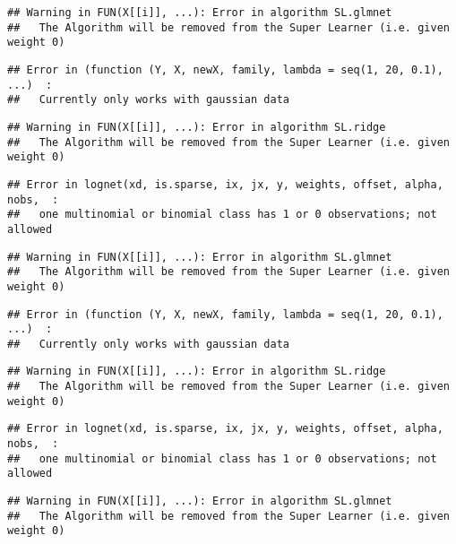 \documentclass[
]{article}
\begin{document}
\begin{verbatim}
## Warning in FUN(X[[i]], ...): Error in algorithm SL.glmnet 
##   The Algorithm will be removed from the Super Learner (i.e. given weight 0)
\end{verbatim}

\begin{verbatim}
## Error in (function (Y, X, newX, family, lambda = seq(1, 20, 0.1), ...)  : 
##   Currently only works with gaussian data
\end{verbatim}

\begin{verbatim}
## Warning in FUN(X[[i]], ...): Error in algorithm SL.ridge 
##   The Algorithm will be removed from the Super Learner (i.e. given weight 0)
\end{verbatim}

\begin{verbatim}
## Error in lognet(xd, is.sparse, ix, jx, y, weights, offset, alpha, nobs,  : 
##   one multinomial or binomial class has 1 or 0 observations; not allowed
\end{verbatim}

\begin{verbatim}
## Warning in FUN(X[[i]], ...): Error in algorithm SL.glmnet 
##   The Algorithm will be removed from the Super Learner (i.e. given weight 0)
\end{verbatim}

\begin{verbatim}
## Error in (function (Y, X, newX, family, lambda = seq(1, 20, 0.1), ...)  : 
##   Currently only works with gaussian data
\end{verbatim}

\begin{verbatim}
## Warning in FUN(X[[i]], ...): Error in algorithm SL.ridge 
##   The Algorithm will be removed from the Super Learner (i.e. given weight 0)
\end{verbatim}

\begin{verbatim}
## Error in lognet(xd, is.sparse, ix, jx, y, weights, offset, alpha, nobs,  : 
##   one multinomial or binomial class has 1 or 0 observations; not allowed
\end{verbatim}

\begin{verbatim}
## Warning in FUN(X[[i]], ...): Error in algorithm SL.glmnet 
##   The Algorithm will be removed from the Super Learner (i.e. given weight 0)
\end{verbatim}
\end{document}
